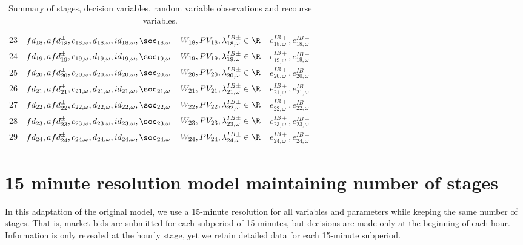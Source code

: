 \begin{table}[H]
\begin{tabular}{c c c c}
	23& $fd_{18}, afd^{\pm}_{18}, c_{18, \omega}, d_{18, \omega}, id_{18, \omega}, \soc_{18, \omega}$ & $W_{18}, PV_{18}, \lambda^{IB\pm}_{18, \omega} \in \R$ &  $e^{IB+}_{18, \omega}, e^{IB-}_{18, \omega}$\\
	24& $fd_{19}, afd^{\pm}_{19}, c_{19, \omega}, d_{19, \omega}, id_{19, \omega}, \soc_{19, \omega}$ & $W_{19}, PV_{19}, \lambda^{IB\pm}_{19, \omega} \in \R$ & $e^{IB+}_{19, \omega}, e^{IB-}_{19, \omega}$\\
	25& $fd_{20}, afd^{\pm}_{20}, c_{20, \omega}, d_{20, \omega}, id_{20, \omega}, \soc_{20, \omega}$  & $W_{20}, PV_{20}, \lambda^{IB\pm}_{20, \omega} \in \R$ & $e^{IB+}_{20, \omega}, e^{IB-}_{20, \omega}$\\
	26&  $fd_{21}, afd^{\pm}_{21}, c_{21, \omega}, d_{21, \omega}, id_{21, \omega}, \soc_{21, \omega}$ & $W_{21}, PV_{21}, \lambda^{IB\pm}_{21, \omega} \in \R$ & $e^{IB+}_{21, \omega}, e^{IB-}_{21, \omega}$\\
	27& $fd_{22}, afd^{\pm}_{22}, c_{22, \omega}, d_{22, \omega}, id_{22, \omega}, \soc_{22, \omega}$ & $W_{22}, PV_{22}, \lambda^{IB\pm}_{22, \omega} \in \R$ & $e^{IB+}_{22, \omega}, e^{IB-}_{22, \omega}$\\
	28& $fd_{23}, afd^{\pm}_{23}, c_{23, \omega}, d_{23, \omega}, id_{23, \omega}, \soc_{23, \omega}$ & $W_{23}, PV_{23}, \lambda^{IB\pm}_{23, \omega} \in \R$ & $e^{IB+}_{23, \omega}, e^{IB-}_{23, \omega}$\\
	29& $fd_{24}, afd^{\pm}_{24}, c_{24, \omega}, d_{24, \omega}, id_{24, \omega}, \soc_{24, \omega}$ & $W_{24}, PV_{24}, \lambda^{IB\pm}_{24, \omega} \in \R$ & $e^{IB+}_{24, \omega}, e^{IB-}_{24, \omega}$\\
		
	
\end{tabular}
\caption{Summary of stages, decision variables, random variable observations and recourse variables.}
\label{TABLE:stages-rv-dv}
\end{table}

\section{15 minute resolution model maintaining number of stages}

In this adaptation of the original model, we use a 15-minute resolution for all variables and parameters while keeping the same number of stages. That is, market bids are submitted for each subperiod of 15 minutes, but decisions are made only at the beginning of each hour. Information is only revealed at the hourly stage, yet we retain detailed data for each 15-minute subperiod.

